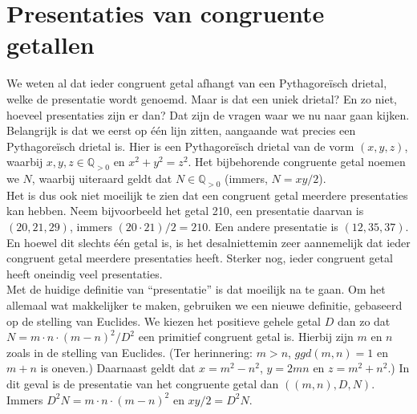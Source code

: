 \documentclass[12pt,reqno]{article}
\newcommand*{\QQ}{\ensuremath{\mathbb{Q}}}
\theoremstyle{theorem}
\theoremstyle{definition}
\begin{document}
	
	\section{Presentaties van congruente getallen}
	We weten al dat ieder congruent getal afhangt van een Pythagore\"isch drietal, welke de presentatie wordt genoemd. Maar is dat een uniek drietal? En zo niet, hoeveel presentaties zijn er dan? Dat zijn de vragen waar we nu naar gaan kijken.\\
	
	Belangrijk is dat we eerst op \'e\'en lijn zitten, aangaande wat precies een Pythagore\"isch drietal is. Hier is een Pythagore\"isch drietal van de vorm $(x,y,z)$, waarbij $x,y,z\in \QQ_{>0}$ en $x^2 + y^2 = z^2$. Het bijbehorende congruente getal noemen we $N$, waarbij uiteraard geldt dat $N\in \QQ_{>0}$ (immers, $N = xy / 2$).\\
	
	Het is dus ook niet moeilijk te zien dat een congruent getal meerdere presentaties kan hebben. Neem bijvoorbeeld het getal 210, een presentatie daarvan is $(20,21,29)$, immers $(20\cdot 21)/2 = 210$. Een andere presentatie is $(12,35,37)$. En hoewel dit slechts \'e\'en getal is, is het desalniettemin zeer aannemelijk dat ieder congruent getal meerdere presentaties heeft. Sterker nog, ieder congruent getal heeft oneindig veel presentaties.\\
	
	Met de huidige definitie van ``presentatie'' is dat moeilijk na te gaan. Om het allemaal wat makkelijker te maken, gebruiken we een nieuwe definitie, gebaseerd op {\color{red}de stelling van Euclides}. We kiezen het positieve gehele getal $D$ dan zo dat $N=m\cdot n \cdot (m-n)^2/D^2$ een primitief congruent getal is. Hierbij zijn $m$ en $n$ zoals in de stelling van Euclides. (Ter herinnering: $m>n$, $ggd(m,n) = 1$ en $m+n$ is oneven.) Daarnaast geldt dat $x = m^2 - n^2$, $y = 2mn$ en $z = m^2 + n^2$.) In dit geval is de presentatie van het congruente getal dan $((m,n),D,N)$. Immers $D^2N = m\cdot n \cdot (m-n)^2$ en $xy/2 = D^2N$.\\
	
\end{document}
